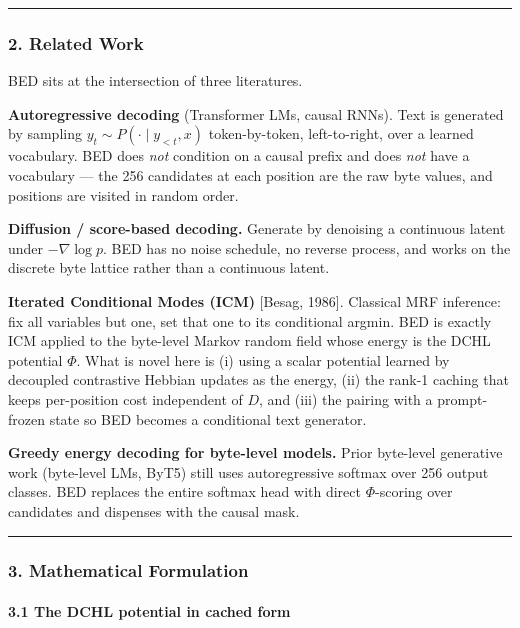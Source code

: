 \documentclass[
  11pt,
  a4paper,
]{article}
\begin{document}
\begin{center}\rule{0.5\linewidth}{0.5pt}\end{center}

\subsubsection{2. Related Work}\label{related-work}

BED sits at the intersection of three literatures.

\textbf{Autoregressive decoding} (Transformer LMs, causal RNNs). Text is
generated by sampling \(y_t \sim P(\cdot \mid y_{<t}, x)\)
token-by-token, left-to-right, over a learned vocabulary. BED does
\emph{not} condition on a causal prefix and does \emph{not} have a
vocabulary --- the 256 candidates at each position are the raw byte
values, and positions are visited in random order.

\textbf{Diffusion / score-based decoding.} Generate by denoising a
continuous latent under \(-\nabla \log p\). BED has no noise schedule,
no reverse process, and works on the discrete byte lattice rather than a
continuous latent.

\textbf{Iterated Conditional Modes (ICM)} {[}Besag, 1986{]}. Classical
MRF inference: fix all variables but one, set that one to its
conditional argmin. BED is exactly ICM applied to the byte-level Markov
random field whose energy is the DCHL potential \(\Phi\). What is novel
here is (i) using a scalar potential learned by decoupled contrastive
Hebbian updates as the energy, (ii) the rank-1 caching that keeps
per-position cost independent of \(D\), and (iii) the pairing with a
prompt-frozen state so BED becomes a conditional text generator.

\textbf{Greedy energy decoding for byte-level models.} Prior byte-level
generative work (byte-level LMs, ByT5) still uses autoregressive softmax
over 256 output classes. BED replaces the entire softmax head with
direct \(\Phi\)-scoring over candidates and dispenses with the causal
mask.

\begin{center}\rule{0.5\linewidth}{0.5pt}\end{center}

\subsubsection{3. Mathematical
Formulation}\label{mathematical-formulation}

\paragraph{3.1 The DCHL potential in cached
form}\label{the-dchl-potential-in-cached-form}
\end{document}
